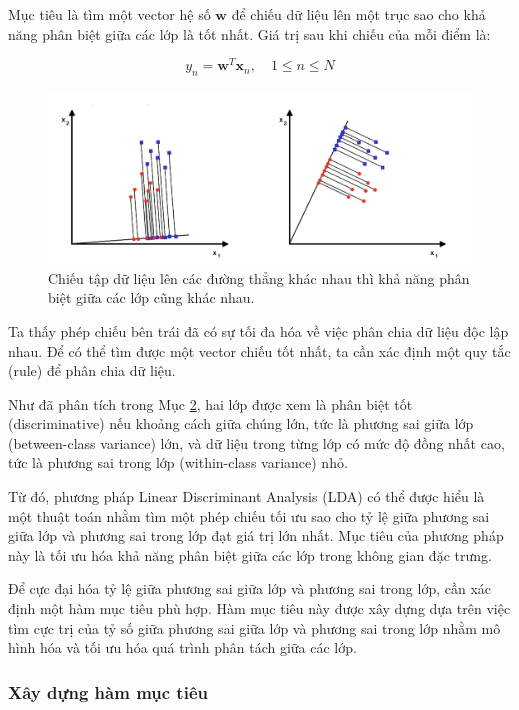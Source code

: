 \documentclass[
  a4paper,
]{article}
\begin{document}
Mục tiêu là tìm một vector hệ số \(\mathbf{w}\) để chiếu dữ liệu lên một
trục sao cho khả năng phân biệt giữa các lớp là tốt nhất. Giá trị sau
khi chiếu của mỗi điểm là:

\[y_n = \mathbf{w}^T \mathbf{x}_n, \quad 1 \leq n \leq N\]

\begin{figure}
\centering
\includegraphics{./assets/projection.png}
\caption{Chiếu tập dữ liệu lên các đường thẳng khác nhau thì khả năng
phân biệt giữa các lớp cũng khác nhau.}
\end{figure}

Ta thấy phép chiếu bên trái đã có sự tối đa hóa về việc phân chia dữ
liệu độc lập nhau. Để có thể tìm được một vector chiếu tốt nhất, ta cần
xác định một quy tắc (rule) để phân chia dữ liệu.

Như đã phân tích trong Mục \href{}{2}, hai lớp được xem là phân biệt tốt
(discriminative) nếu khoảng cách giữa chúng lớn, tức là phương sai giữa
lớp (between-class variance) lớn, và dữ liệu trong từng lớp có mức độ
đồng nhất cao, tức là phương sai trong lớp (within-class variance) nhỏ.

Từ đó, phương pháp Linear Discriminant Analysis (LDA) có thể được hiểu
là một thuật toán nhằm tìm một phép chiếu tối ưu sao cho tỷ lệ giữa
phương sai giữa lớp và phương sai trong lớp đạt giá trị lớn nhất. Mục
tiêu của phương pháp này là tối ưu hóa khả năng phân biệt giữa các lớp
trong không gian đặc trưng.

Để cực đại hóa tỷ lệ giữa phương sai giữa lớp và phương sai trong lớp,
cần xác định một hàm mục tiêu phù hợp. Hàm mục tiêu này được xây dựng
dựa trên việc tìm cực trị của tỷ số giữa phương sai giữa lớp và phương
sai trong lớp nhằm mô hình hóa và tối ưu hóa quá trình phân tách giữa
các lớp.

\subsubsection{Xây dựng hàm mục
tiêu}\label{xuxe2y-dux1ef1ng-huxe0m-mux1ee5c-tiuxeau}
\end{document}
